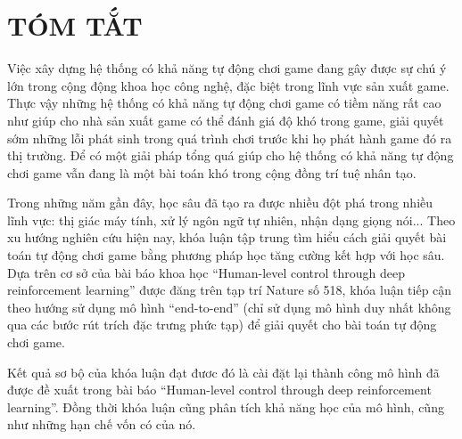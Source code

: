 \chapter*{TÓM TẮT}
Việc xây dựng hệ thống có khả năng tự động chơi game đang gây được sự chú ý lớn trong cộng động khoa học công nghệ, đặc biệt trong lĩnh vực sản xuất game. Thực vậy những hệ thống có khả năng tự động chơi game có tiềm năng rất cao như giúp cho nhà sản xuất game có thể đánh giá độ khó trong game, giải quyết sớm những lỗi phát sinh trong quá trình chơi trước khi họ phát hành game đó ra thị trường. Để có một giải pháp tổng quá giúp cho hệ thống có khả năng tự động chơi game vẫn đang là một bài toán khó trong cộng đồng trí tuệ nhân tạo.

Trong những năm gần đây, học sâu đã tạo ra được nhiều đột phá trong nhiều lĩnh vực: thị giác máy tính, xử lý ngôn ngữ tự nhiên, nhận dạng giọng nói... Theo xu hướng nghiên cứu hiện nay, khóa luận tập trung tìm hiểu cách giải quyết bài toán tự động chơi game bằng phương pháp học tăng cường kết hợp với học sâu. Dựa trên cơ sở của bài báo khoa học ``Human-level control through deep reinforcement learning'' được đăng trên tạp trí Nature số 518, khóa luận tiếp cận theo hướng sử dụng mô hình ``end-to-end'' (chỉ sử dụng mô hình duy nhất không qua các bước rút trích đặc trưng phức tạp) để giải quyết cho bài toán tự động chơi game.

Kết quả sơ bộ của khóa luận đạt đươc đó là cài đặt lại thành công mô hình đã được đề xuất trong bài báo ``Human-level control through deep reinforcement learning''. Đồng thời khóa luận cũng phân tích khả năng học của mô hình, cũng như những hạn chế vốn có của nó.